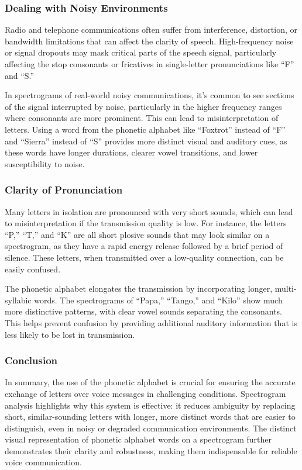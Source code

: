 \subsubsection*{Dealing with Noisy Environments}
Radio and telephone communications often suffer from interference, distortion, or bandwidth limitations that can affect the clarity of speech. High-frequency noise or signal dropouts may mask critical parts of the speech signal, particularly affecting the stop consonants or fricatives in single-letter pronunciations like ``F'' and ``S.''

In spectrograms of real-world noisy communications, it’s common to see sections of the signal interrupted by noise, particularly in the higher frequency ranges where consonants are more prominent. This can lead to misinterpretation of letters. Using a word from the phonetic alphabet like ``Foxtrot'' instead of ``F'' and ``Sierra'' instead of ``S'' provides more distinct visual and auditory cues, as these words have longer durations, clearer vowel transitions, and lower susceptibility to noise.

\subsubsection*{Clarity of Pronunciation}
Many letters in isolation are pronounced with very short sounds, which can lead to misinterpretation if the transmission quality is low. For instance, the letters ``P,'' ``T,'' and ``K'' are all short plosive sounds that may look similar on a spectrogram, as they have a rapid energy release followed by a brief period of silence. These letters, when transmitted over a low-quality connection, can be easily confused.

The phonetic alphabet elongates the transmission by incorporating longer, multi-syllabic words. The spectrograms of ``Papa,'' ``Tango,'' and ``Kilo'' show much more distinctive patterns, with clear vowel sounds separating the consonants. This helps prevent confusion by providing additional auditory information that is less likely to be lost in transmission.

\subsubsection*{Conclusion}
In summary, the use of the phonetic alphabet is crucial for ensuring the accurate exchange of letters over voice messages in challenging conditions. Spectrogram analysis highlights why this system is effective: it reduces ambiguity by replacing short, similar-sounding letters with longer, more distinct words that are easier to distinguish, even in noisy or degraded communication environments. The distinct visual representation of phonetic alphabet words on a spectrogram further demonstrates their clarity and robustness, making them indispensable for reliable voice communication.
